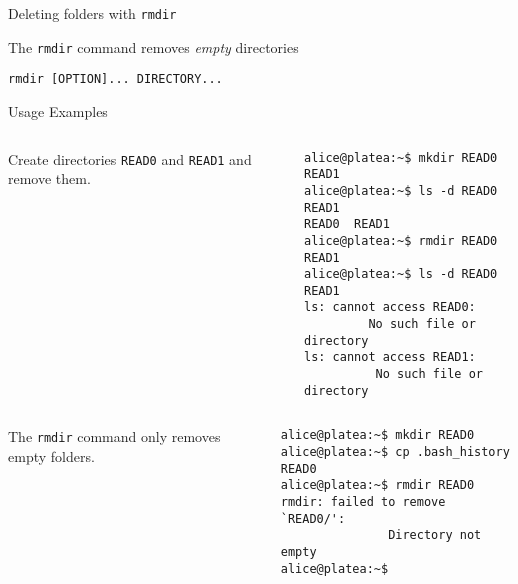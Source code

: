 \begin{frame}[t,fragile]{Deleting folders with \alert{\texttt{rmdir}}}

  \vspace{-0.3cm}
  \begin{block}{The  \texttt{rmdir} command  removes \emph{empty} directories}
    {\footnotesize
      \begin{lstlisting}
rmdir [OPTION]... DIRECTORY...
      \end{lstlisting}
 

  Usage Examples
}


\vspace{-0.3cm}
{\scriptsize

  \begin{columns}
        Create directories \texttt{READ0}
    and  \texttt{READ1} and remove them.
        \begin{lstlisting}
alice@platea:~$ mkdir READ0 READ1
alice@platea:~$ ls -d READ0 READ1
READ0  READ1
alice@platea:~$ rmdir READ0 READ1
alice@platea:~$ ls -d READ0 READ1
ls: cannot access READ0: 
         No such file or directory
ls: cannot access READ1: 
          No such file or directory
        \end{lstlisting}
    \end{columns}
  \begin{columns}
        The \texttt{rmdir} command only
    removes empty folders.
        \begin{lstlisting}
alice@platea:~$ mkdir READ0
alice@platea:~$ cp .bash_history READ0 
alice@platea:~$ rmdir READ0
rmdir: failed to remove `READ0/': 
               Directory not empty
alice@platea:~$
        \end{lstlisting}
    \end{columns}
}
  \end{block}
  
\end{frame}
